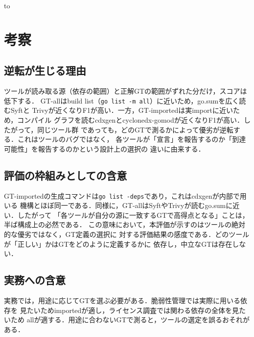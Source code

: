 \documentclass{css}
\def\|{\verb|}
\begin{document}
\begin{table}[tb]
\caption{母数差のロバストネス検証（imported，name一致，macro-F1，\%）}
\label{tab:robust}
\hbox to
\end{table}

%% ============================================================
\section{考察}
%% ============================================================

\subsection{逆転が生じる理由}
ツールが読み取る源（依存の範囲）と正解GTの範囲がずれた分だけ，スコアは低下する．
GT-allはbuild list（\|go list -m all|）に近いため，go.sumを広く読むSyftと
Trivyが近くなりF1が高い．一方，GT-importedは実importに近いため，コンパイル
グラフを読むcdxgenとcyclonedx-gomodが近くなりF1が高い．したがって，同じツール群
であっても，どのGTで測るかによって優劣が逆転する．これはツールのバグではなく，
各ツールが「宣言」を報告するのか「到達可能性」を報告するのかという設計上の選択の
違いに由来する．

\subsection{評価の枠組みとしての含意}
GT-importedの生成コマンドは\|go list -deps|であり，これはcdxgenが内部で用いる
機構とほぼ同一である．同様に，GT-allはSyftやTrivyが読むgo.sumに近い．したがって
「各ツールが自分の源に一致するGTで高得点となる」ことは，半ば構成上の必然である．
この意味において，本評価が示すのはツールの絶対的な優劣ではなく，GT定義の選択に
対する評価結果の感度である．どのツールが「正しい」かはGTをどのように定義するかに
依存し，中立なGTは存在しない．

\subsection{実務への含意}
実務では，用途に応じてGTを選ぶ必要がある．脆弱性管理では実際に用いる依存を
見たいためimportedが適し，ライセンス調査では関わる依存の全体を見たいため
allが適する．用途に合わないGTで測ると，ツールの選定を誤るおそれがある．
\end{document}
